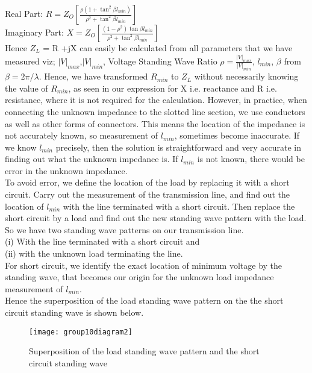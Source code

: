 Real Part: $R = Z_{O}[\frac{\rho (1 + \tan^{2}\beta l_{min})}{\rho^{2} + \tan^{2}\beta l_{min}}]$\\

Imaginary Part: $ X = Z_{O}[\frac{(1-\rho^{2})\tan\beta l_{min}}{\rho^{2} + \tan^{2}\beta l_{min}}]  $\\

Hence $Z_{L}$ = R +jX can easily be calculated from all parameters that we have measured viz; $|V|_{max}$,$|V|_{min}$, Voltage Standing Wave Ratio $\rho = \frac{|V|_{max}}{|V|_{min}}$, $l_{min}$, $\beta$ from $\beta = 2\pi/\lambda$. Hence, we have transformed $R_{min}$ to $Z_{L}$ without necessarily knowing the value of $R_{min}$, as seen in our expression for X i.e. reactance and R i.e. resistance, where it is not required for the calculation. 
However, in practice, when connecting the unknown impedance to the slotted line section, we use conductors as well as other forms of connectors. This means the location of the impedance is not accurately known, so measurement of $l_{min}$, sometimes become inaccurate. If we know $l_{min}$ precisely, then the solution is straightforward and very accurate in finding out what the unknown impedance is. If $l_{min}$ is not known, there would be error in the unknown impedance.\\

To avoid error, we define the location of the load by replacing it with a short circuit. Carry out the measurement of the transmission line, and find out the location of $l_{min}$ with the line terminated with a short circuit. Then replace the short circuit by a load and find out the new standing wave pattern with the load. So we have two standing wave patterns on our transmission line. \\(i) With the line terminated with a short circuit and \\(ii) with the unknown load terminating the line.\\ For short circuit, we identify the exact location of minimum voltage by the standing wave, that becomes our origin for the unknown load impedance measurement of $l_{min}$.\\

Hence the superposition of the load standing wave pattern on the the short circuit standing wave is shown below.
\begin{figure}[h]
	\centering
	\texttt{[image: group10diagram2]}
	\caption{Superposition of the load standing wave pattern and the short circuit standing wave}
\end{figure}

